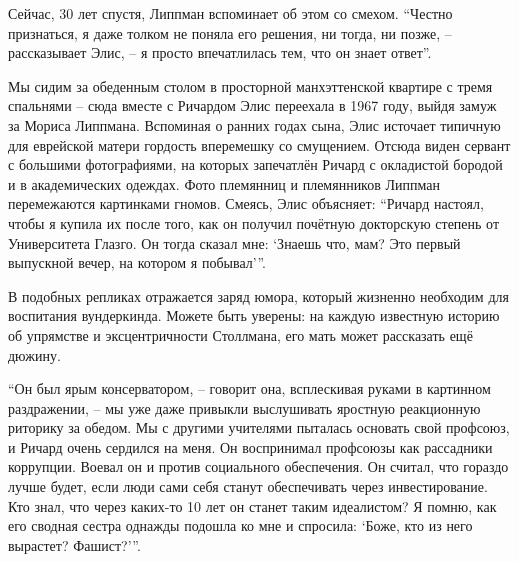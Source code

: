 Сейчас, 30 лет спустя, Липпман вспоминает об этом со смехом. \enquote{Честно признаться, я даже толком не поняла его решения, ни тогда, ни позже, -- рассказывает Элис, -- я просто впечатлилась тем, что он знает ответ}.

Мы сидим за обеденным столом в просторной манхэттенской квартире с тремя спальнями -- сюда вместе с Ричардом Элис переехала в 1967 году, выйдя замуж за Мориса Липпмана. Вспоминая о ранних годах сына, Элис источает типичную для еврейской матери гордость вперемешку со смущением. Отсюда виден сервант с большими фотографиями, на которых запечатлён Ричард с окладистой бородой и в академических одеждах. Фото племянниц и племянников Липпман перемежаются картинками гномов. Смеясь, Элис объясняет: \enquote{Ричард настоял, чтобы я купила их после того, как он получил почётную докторскую степень от Университета Глазго. Он тогда сказал мне: `Знаешь что, мам? Это первый выпускной вечер, на котором я побывал'\hspace{0.01in}}.

В подобных репликах отражается заряд юмора, который жизненно необходим для воспитания вундеркинда. Можете быть уверены: на каждую известную историю об упрямстве и эксцентричности Столлмана, его мать может рассказать ещё дюжину.

\enquote{Он был ярым консерватором, -- говорит она, всплескивая руками в картинном раздражении, -- мы уже даже привыкли выслушивать яростную реакционную риторику за обедом. Мы с другими учителями пыталась основать свой профсоюз, и Ричард очень сердился на меня. Он воспринимал профсоюзы как рассадники коррупции. Воевал он и против социального обеспечения. Он считал, что гораздо лучше будет, если люди сами себя станут обеспечивать через инвестирование. Кто знал, что через каких-то 10 лет он станет таким идеалистом? Я помню, как его сводная сестра однажды подошла ко мне и спросила: `Боже, кто из него вырастет? Фашист?'\hspace{0.01in}}.

